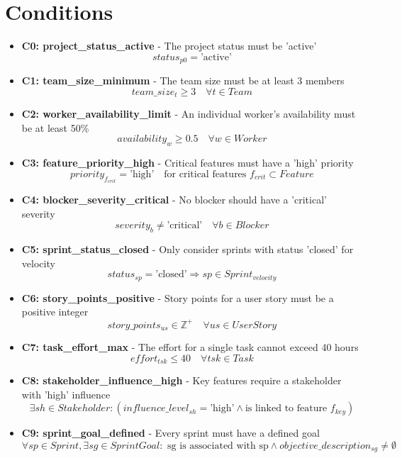 \documentclass{article}
\begin{document}
\section{Conditions}
\begin{itemize}
    \item \textbf{C0: project\_status\_active} - The project status must be 'active'
        \[ status_{p0} = \text{'active'} \]
    \item \textbf{C1: team\_size\_minimum} - The team size must be at least 3 members
        \[ team\_size_t \geq 3 \quad \forall t \in Team \]
    \item \textbf{C2: worker\_availability\_limit} - An individual worker's availability must be at least 50\%
        \[ availability_w \geq 0.5 \quad \forall w \in Worker \]
    \item \textbf{C3: feature\_priority\_high} - Critical features must have a 'high' priority
        \[ priority_{f_{crit}} = \text{'high'} \quad \text{for critical features } f_{crit} \subset Feature \]
    \item \textbf{C4: blocker\_severity\_critical} - No blocker should have a 'critical' severity
        \[ severity_b \neq \text{'critical'} \quad \forall b \in Blocker \]
    \item \textbf{C5: sprint\_status\_closed} - Only consider sprints with status 'closed' for velocity
        \[ status_{sp} = \text{'closed'} \Rightarrow sp \in Sprint_{velocity} \]
    \item \textbf{C6: story\_points\_positive} - Story points for a user story must be a positive integer
        \[ story\_points_{us} \in \mathbb{Z}^+ \quad \forall us \in UserStory \]
    \item \textbf{C7: task\_effort\_max} - The effort for a single task cannot exceed 40 hours
        \[ effort_{tsk} \leq 40 \quad \forall tsk \in Task \]
    \item \textbf{C8: stakeholder\_influence\_high} - Key features require a stakeholder with 'high' influence
        \[ \exists sh \in Stakeholder : (influence\_level_{sh} = \text{'high'} \land \text{is linked to feature } f_{key}) \]
    \item \textbf{C9: sprint\_goal\_defined} - Every sprint must have a defined goal
        \[ \forall sp \in Sprint, \exists sg \in SprintGoal : \text{ sg is associated with sp} \land objective\_description_{sg} \neq \emptyset \]
\end{itemize}
\end{document}
